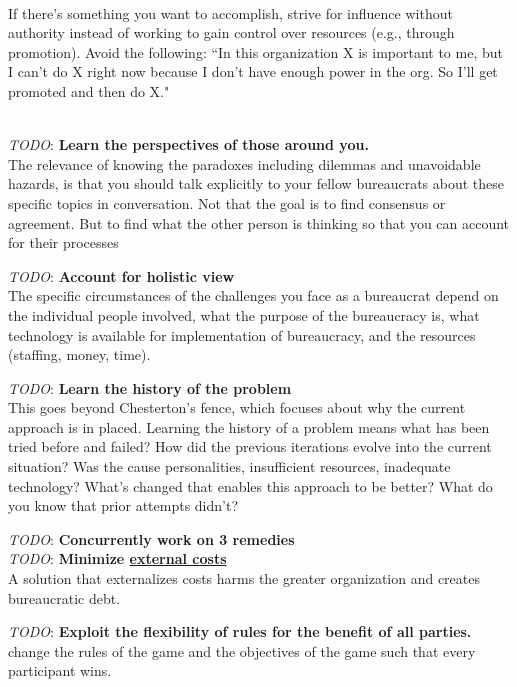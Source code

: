 \ \\

If there's something you want to accomplish, strive for influence without authority instead of working to gain control over resources (e.g., through promotion). Avoid the following: ``In this organization X is important to me, but I can't do X right now because I don't have enough power in the org. So I'll get promoted and then do X."

\ \\



\textit{TODO}: \textbf{Learn the perspectives of those around you.}\\
The relevance of knowing the paradoxes including dilemmas and unavoidable hazards, is that you should talk explicitly to your fellow bureaucrats about these specific topics in conversation. Not that the goal is to find consensus or agreement. But to find what the other person is thinking so that you can account for their processes


\textit{TODO}: \textbf{Account for holistic view}\\
The specific circumstances of the challenges you face as a bureaucrat depend on the individual people involved, what the purpose of the bureaucracy is, what technology is available for implementation of bureaucracy, and the resources (staffing, money, time). 

\textit{TODO}: \textbf{Learn the history of the problem}\\
This goes beyond Chesterton's fence, which focuses about why the current approach is in placed. Learning the history of a problem means what has been tried before and failed? How did the previous iterations evolve into the current situation? Was the cause personalities, insufficient resources, inadequate technology? What's changed that enables this approach to be better? What do you know that prior attempts didn't?

\textit{TODO}: \textbf{Concurrently work on 3 remedies}\\


\textit{TODO}: \textbf{Minimize \href{https://en.wikipedia.org/wiki/Externality}{external costs}}\\
A solution that externalizes costs harms the greater organization and creates bureaucratic debt.


\textit{TODO}: \textbf{Exploit the flexibility of rules for the benefit of all parties.}\\
change the rules of the game and the objectives of the game such that every participant wins.

